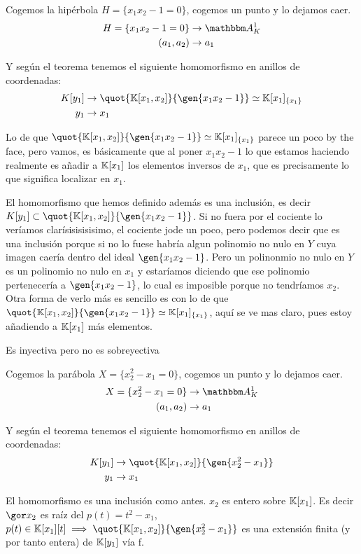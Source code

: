 	\begin{example}
		Cogemos la hipérbola $H=\{x_1x_2-1=0\}$, cogemos un punto y lo dejamos caer.
		\begin{align*}
			H=\{x_1x_2-1=0\} & \rightarrow \A_K^1 \\
			(a_1,a_2) & \rightarrow a_1
		\end{align*}
		
		Y según el teorema tenemos el siguiente homomorfismo en anillos de coordenadas:
		\begin{align*}
			K[y_1] & \rightarrow \quot{\K[x_1,x_2]}{\gen{x_1x_2-1}} \simeq \K[x_1]_{\{x_1\}} \\
			y_1 & \rightarrow x_1 \\
		\end{align*}
		
		Lo de que $\quot{\K[x_1,x_2]}{\gen{x_1x_2-1}} \simeq \K[x_1]_{\{x_1\}}$ parece un poco by the face, pero vamos, es básicamente que al poner $x_1x_2-1$ lo que estamos haciendo realmente es añadir a $\mathbb{K}[x_1]$ los elementos inversos de $x_1$, que es precisamente lo que significa localizar en $x_1$.
		
		El homomorfismo que hemos definido además es una inclusión, es decir $K[y_1] \subset \quot{\K[x_1,x_2]}{\gen{x_1x_2-1}}$. Si no fuera por el cociente lo veríamos clarísisisisisimo, el cociente jode un poco, pero podemos decir que es una inclusión porque si no lo fuese habría algun polinomio no nulo en $Y$ cuya imagen caería dentro del ideal $\gen{x_1x_2-1}$. Pero un polinonmio no nulo en $Y$ es un polinomio no nulo en $x_1$ y estaríamos diciendo que ese polinomio pertenecería a $\gen{x_1x_2-1}$, lo cual es imposible porque no tendríamos $x_2$.  Otra forma de verlo más es sencillo es con lo de que $\quot{\K[x_1,x_2]}{\gen{x_1x_2-1}} \simeq \K[x_1]_{\{x_1\}}$, aquí se ve mas claro, pues estoy añadiendo a $\mathbb{K}[x_1]$ más elementos.
		
		Es inyectiva pero no es sobreyectiva %
	\end{example}
	
	\begin{example}
		Cogemos la parábola $X=\{x_2^2-x_1=0\}$, cogemos un punto y lo dejamos caer.
		\begin{align*}
			X=\{x_2^2-x_1=0\} & \rightarrow \A_K^1 \\
			(a_1,a_2) & \rightarrow a_1
		\end{align*}
		
		Y según el teorema tenemos el siguiente homomorfismo en anillos de coordenadas:
		\begin{align*}
			K[y_1] & \rightarrow \quot{\K[x_1,x_2]}{\gen{x_2^2-x_1}} \\
			y_1 & \rightarrow x_1
		\end{align*}
		
		El homomorfismo es una inclusión como antes. $x_2$ es entero sobre $\mathbb{K}[x_1]$. Es decir $\cls{x_2}$ es raíz del $p(t)=t^2-x_1$, $p(t)\in \K[x_1][t] \implies \quot{\K[x_1,x_2]}{\gen{x_2^2-x_1}}$ es una extensión finita (y por tanto entera) de $\mathbb{K}[y_1]$ vía f.
	\end{example}
	
